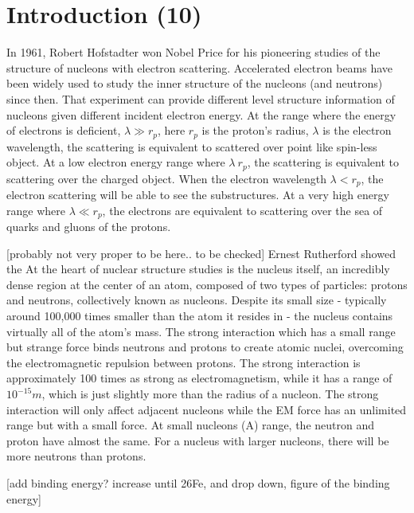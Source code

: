 \chapter{Introduction (10)}

In 1961, Robert Hofstadter won Nobel Price for his pioneering studies of the structure of nucleons with electron scattering. Accelerated electron beams have been widely used to study the inner structure of the nucleons (and neutrons) since then. That experiment can provide different level structure information of nucleons given different incident electron energy. At the range where the energy of electrons is deficient, $\lambda \gg r_p$, here $r_p$ is the proton's radius, $\lambda$ is the electron wavelength, the scattering is equivalent to scattered over point like spin-less object. At a low electron energy range where $\lambda ~r_p$, the scattering is equivalent to scattering over the charged object. When the electron wavelength $\lambda < r_p$, the electron scattering will be able to see the substructures. At a very high energy range where $\lambda \ll r_p$, the electrons are equivalent to scattering over the sea of quarks and gluons of the protons. 

[probably not very proper to be here.. to be checked]
Ernest Rutherford showed the 
At the heart of nuclear structure studies is the nucleus itself, an incredibly dense region at the center of an atom, composed of two types of particles: protons and neutrons, collectively known as nucleons. Despite its small size - typically around 100,000 times smaller than the atom it resides in - the nucleus contains virtually all of the atom's mass. The strong interaction which has a small range but strange force binds neutrons and protons to create atomic nuclei, overcoming the electromagnetic repulsion between protons. The strong interaction is approximately 100 times as strong as electromagnetism, while it has a range of $10^{-15}m$, which is just slightly more than the radius of a nucleon. The strong interaction will only affect adjacent nucleons while the EM force has an unlimited range but with a small force. At small nucleons (A) range, the neutron and proton have almost the same. For a nucleus with larger nucleons, there will be more neutrons than protons. 

[add binding energy? increase until 26Fe, and drop down, figure of the binding energy]

